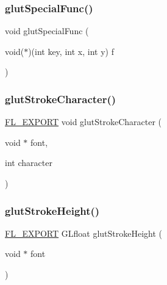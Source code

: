 \subsubsection{\texorpdfstring{glut\+Special\+Func()}{glutSpecialFunc()}}
{\footnotesize\ttfamily void glut\+Special\+Func (\begin{DoxyParamCaption}\item[{void($\ast$)(int key, int x, int y)}]{f }\end{DoxyParamCaption})\hspace{0.3cm}{\ttfamily [inline]}}

\mbox{\label{glut_8_h_aa0fb193cad20aaceb1fb79733cfb1385}} 
\subsubsection{\texorpdfstring{glut\+Stroke\+Character()}{glutStrokeCharacter()}}
{\footnotesize\ttfamily \hyperlink{_fl___export_8_h_aa9ba29a18aee9d738370a06eeb4470fc}{F\+L\+\_\+\+E\+X\+P\+O\+RT} void glut\+Stroke\+Character (\begin{DoxyParamCaption}\item[{void $\ast$}]{font,  }\item[{int}]{character }\end{DoxyParamCaption})}

\mbox{\label{glut_8_h_a7d3a9f82ef865fec75b1526aa31dc65e}} 
\subsubsection{\texorpdfstring{glut\+Stroke\+Height()}{glutStrokeHeight()}}
{\footnotesize\ttfamily \hyperlink{_fl___export_8_h_aa9ba29a18aee9d738370a06eeb4470fc}{F\+L\+\_\+\+E\+X\+P\+O\+RT} G\+Lfloat glut\+Stroke\+Height (\begin{DoxyParamCaption}\item[{void $\ast$}]{font }\end{DoxyParamCaption})}

\mbox{\label{glut_8_h_a79fd5b4615949e1b6832afb9f79ed5d1}} 
